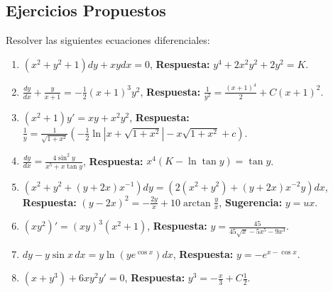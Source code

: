 \subsection{Ejercicios Propuestos}

Resolver las siguientes ecuaciones diferenciales:

\begin{enumerate}
    \item \( (x^2 + y^2 + 1)dy + xy dx = 0 \), \textbf{Respuesta:} \( y^4 + 2x^2 y^2 + 2y^2 = K \).

    \item \( \frac{dy}{dx} + \frac{y}{x+1} = -\frac{1}{2}(x+1)^3 y^2 \), \textbf{Respuesta:} \( \frac{1}{y^2} = \frac{(x+1)^4}{2} + C(x+1)^2 \).

    \item \( (x^2 + 1)y' = xy + x^2 y^2 \), \textbf{Respuesta:} \( \frac{1}{y} = \frac{1}{\sqrt{1+x^2}} \left(-\frac{1}{2} \ln |x + \sqrt{1+x^2}| - x \sqrt{1+x^2} + c \right) \).

    \item \( \frac{dy}{dx} = \frac{4 \sin^2 y}{x^5 + x \tan y} \), \textbf{Respuesta:} \( x^4(K - \ln \tan y) = \tan y \).

    \item \( (x^2 + y^2 + (y + 2x)x^{-1}) dy = (2(x^2 + y^2) + (y + 2x)x^{-2}y)dx \),  
    \textbf{Respuesta:} \( (y - 2x)^2 = -\frac{2y}{x} + 10 \arctan \frac{y}{x} \), \textbf{Sugerencia:} \( y = ux \).

    \item \( (xy^2)' = (xy)^3 (x^2 + 1) \), \textbf{Respuesta:} \( y = \frac{45}{45 \sqrt{x} - 5x^5 - 9x^3} \).

    \item \( dy - y \sin x \,dx = y \ln(y e^{\cos x})dx \), \textbf{Respuesta:} \( y = -e^{x - \cos x} \).

    \item \( (x + y^3) + 6xy^2 y' = 0 \), \textbf{Respuesta:} \( y^3 = -\frac{x}{3} + C \frac{1}{2} \).

\end{enumerate}

